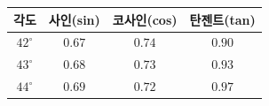 {\renewcommand{\arraystretch}{1.45}\small
\begin{tabular}{|c|c|c|c|}
\hline
각도 & 사인(sin) & 코사인(cos) & 탄젠트(tan) \\ \hline
$42^\circ$ & $0.67$ & $0.74$ & $0.90$ \\ \hline
$43^\circ$ & $0.68$ & $0.73$ & $0.93$ \\ \hline
$44^\circ$ & $0.69$ & $0.72$ & $0.97$ \\ \hline
\end{tabular}}
